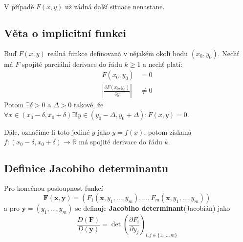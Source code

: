 \documentclass[../main.tex]{subfiles}
\begin{document}
\noindent
\hspace{1.2mm}
V případě $F(x,y)$ už zádná další situace nenastane.

\subsection{Věta o implicitní funkci}
\hspace{1.2mm}
\noindent
Buď $F(x,y)$ reálná funkce definovaná v nějakém okolí bodu $(x_0, y_0)$. Nechť má $F$ spojité parciální
derivace do řádu $k \geq 1$ a nechť platí:
\begin{align*}
    F(x_0, y_0) &= 0\\
    \left| \frac{\partial F(x_0,y_0)}{\partial y} \right| &\neq 0
\end{align*}
Potom $ \exists \delta > 0$ a $\Delta > 0$ takové, že
$\forall x \in (x_0 - \delta , x_0 + \delta) \exists! y \in (y_0 - \Delta , y_0 + \Delta): F(x,y) = 0$.

\noindent
Dále, označíme-li toto jediné $y$ jako $y = f(x)$, potom získaná
$f: (x_0 - \delta , x_0 + \delta ) \to \mathbb{R}$ má spojité derivace do řádu $k$.




\subsection{Definice Jacobiho determinantu}
\hspace{1.2mm}
\noindent
Pro konečnou posloupnost funkcí
\[ \mathbf{F}(\mathbf{x}, \mathbf{y}) =
(F_1(\mathbf{x}, y_1, ..., y_m), ... , F_m(\mathbf{x}, y_1, ..., y_m)) \]
a pro $\mathbf{y} = (y_1, ... , y_m)$ se definuje \textbf{Jacobiho determinant}(Jacobián) jako
\[ \frac{D(\mathbf{F})}{D(\mathbf{y})} =
\det \left( \frac{\partial F_i}{\partial y_j} \right)_{i,j \in \{ 1, ... , m\}} \]
\end{document}
